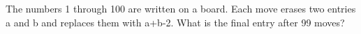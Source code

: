 The numbers 1 through 100 are written on a board. Each move erases two entries a and b and replaces them with a+b-2. What is the final entry after 99 moves?
